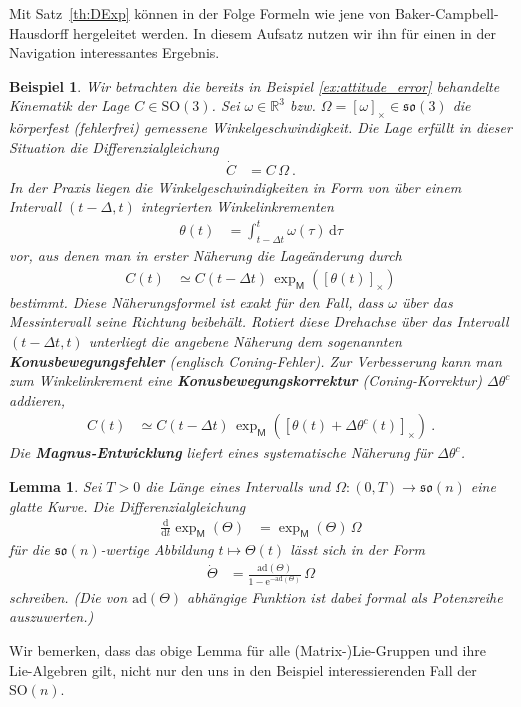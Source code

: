 \documentclass[10pt,a4paper]{article}
\theoremstyle{mytheorem}
\newtheorem{lemma}[theorem]{Lemma}
\theoremstyle{mydefinition}
\newtheorem{example}[theorem]{Beispiel}
\newcommand{\mydef}[1]{\textbf{\textit{#1}}}
\newcommand{\dt}{\mathrm{d}}
\newcommand{\ad}{\mathrm{ad}}
\newcommand{\SO}{\mathrm{SO}}
\newcommand{\fso}{\mathfrak{so}}
\begin{document}
Mit Satz~\ref{th:DExp} können in der Folge Formeln wie jene von Baker-Campbell-Hausdorff hergeleitet werden.
In diesem Aufsatz nutzen wir ihn für einen in der Navigation interessantes Ergebnis.
\begin{example}
\label{ex:coning1}
Wir betrachten die bereits in Beispiel \ref{ex:attitude_error} behandelte Kinematik der Lage $C\in\SO(3)$.
Sei $\omega\in\mathbb{R}^3$ bzw. $\Omega=[\omega]_\times\in\fso(3)$ die körperfest (fehlerfrei) gemessene Winkelgeschwindigkeit.
Die Lage erfüllt in dieser Situation die Differenzialgleichung
\begin{align*}
	\dot{C} &= C\,\Omega
	\ .
\end{align*}
In der Praxis liegen die Winkelgeschwindigkeiten in Form von über einem Intervall $(t-\Delta, t)$ integrierten Winkelinkrementen
\begin{align*}
	\theta(t) &= \int_{t-\Delta t}^t\omega(\tau)\,\dt \tau
\end{align*}
vor, aus denen man in erster Näherung die Lageänderung durch
\begin{align*}
	C(t) &\simeq C(t - \Delta t)\,\exp_\mathsf{M}([\theta(t)]_\times)
\end{align*}
bestimmt.
Diese Näherungsformel ist exakt für den Fall, dass $\omega$ über das Messintervall seine Richtung beibehält.
Rotiert diese Drehachse über das Intervall $(t-\Delta t, t)$ unterliegt die angebene Näherung dem sogenannten \mydef{Konusbewegungsfehler} (englisch \emph{Coning}-Fehler).
Zur Verbesserung kann man zum Winkelinkrement eine \mydef{Konusbewegungskorrektur} (\emph{Coning}-Korrektur) $\Delta\theta^c$ addieren,
\begin{align*}
	C(t) &\simeq C(t - \Delta t)\,
	\exp_\mathsf{M}([\theta(t) + \Delta\theta^c(t)]_\times)
	\ .
\end{align*}
Die \mydef{Magnus-Entwicklung} liefert eines systematische Näherung für $\Delta\theta^c$.\footnotemark
\end{example}

\begin{lemma}
\label{th:MagnusLemma}
Sei $T>0$ die Länge eines Intervalls und $\Omega: (0,T)\rightarrow\fso(n)$ eine glatte Kurve.
Die Differenzialgleichung 
\begin{align*}
	\frac{\dt}{\dt t}\exp_\mathsf{M}(\Theta)
	&= \exp_\mathsf{M}(\Theta)\,\Omega
\end{align*}
für die $\fso(n)$-wertige Abbildung $t\mapsto\Theta(t)$ lässt sich in der Form
\begin{align*}
	\dot{\Theta}
	&= \frac{\ad(\Theta)}{1 - \mathrm{e}^{-\ad(\Theta)}}\,\Omega
\end{align*}
schreiben.
(Die von $\ad(\Theta)$ abhängige Funktion ist dabei formal als Potenzreihe auszuwerten.)
\end{lemma}
Wir bemerken, dass das obige Lemma für alle (Matrix-)Lie-Gruppen und ihre Lie-Algebren gilt, nicht nur den uns in den Beispiel interessierenden Fall der $\SO(n)$.
\end{document}
